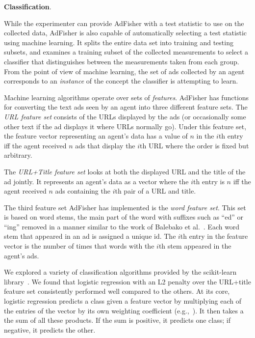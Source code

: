 \documentclass{article}
\makeatletter
\newcommand\gobblepars{\@ifnextchar\par {\expandafter\gobblepars\@gobble}{}}
\renewcommand{\paragraph}[1]{\smallskip\noindent\textbf{#1}.\ \ \gobblepars}
\makeatother
\begin{document}
\paragraph{Classification}\label{sec:MLclass}
While the experimenter can provide AdFisher with a test statistic to use on the collected data, AdFisher is also capable of automatically selecting a test statistic using machine learning. It splits the entire data set into training and testing subsets, and examines a training subset of the collected measurements to select a classifier that distinguishes between the measurements taken from each group.
From the point of view of machine learning, the set of ads collected by an agent corresponds to an \emph{instance} of the concept the classifier is attempting to learn.

Machine learning algorithms operate over sets of \emph{features}.  AdFisher has functions for converting the text ads seen by an agent into three different feature sets.  The \emph{URL feature set} consists of the URLs displayed by the ads (or occasionally some other text if the ad displays it where URLs normally go).  Under this feature set, the feature vector representing an agent's data has a value of $n$ in the $i$th entry iff the agent received $n$ ads that display the $i$th URL where the order is fixed but arbitrary.


The \emph{URL+Title feature set} looks at both the displayed URL and the title of the ad jointly.  It represents an agent's data as a vector where the $i$th entry is $n$ iff the agent received $n$ ads containing the $i$th pair of a URL and title.



The third feature set AdFisher has implemented is the \emph{word feature set}.  This set is based on word stems, the main part of the word with suffixes such as ``ed'' or ``ing'' removed in a manner similar to the work of Balebako et al.~\cite{balebako12w2sp}.  Each word stem that appeared in an ad is assigned a unique id.  The $i$th entry in the feature vector is the number of times that words with the $i$th stem appeared in the agent's ads.







We explored a variety of classification algorithms
provided by the scikit-learn library~\cite{scikit-learn}.
We found that logistic regression with an L2 penalty over the URL+title feature set consistently performed well compared to the others.  At its core, logistic regression predicts a class given a feature vector by multiplying each of the entries of the vector by its own weighting coefficient (e.g.,~\cite{bishop06pattern}).  It then takes a the sum of all these products.  If the sum is positive, it predicts one class; if negative, it predicts the other.  
\end{document}
